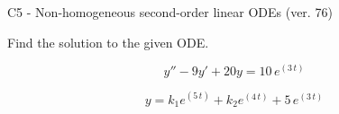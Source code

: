 \begin{exercise}
  \begin{exerciseTitle}C5 - Non-homogeneous second-order linear ODEs (ver. 76)\end{exerciseTitle}
  \begin{exerciseStatement}
    
Find the solution to the given ODE.

    
\[y''-9y'+20y = 10 \, e^{\left(3 \, t\right)}\]

  \end{exerciseStatement}
  \begin{exerciseAnswer}
    
\[y= k_{1} e^{\left(5 \, t\right)} + k_{2} e^{\left(4 \, t\right)} + 5 \, e^{\left(3 \, t\right)}\]

  \end{exerciseAnswer}
\end{exercise}